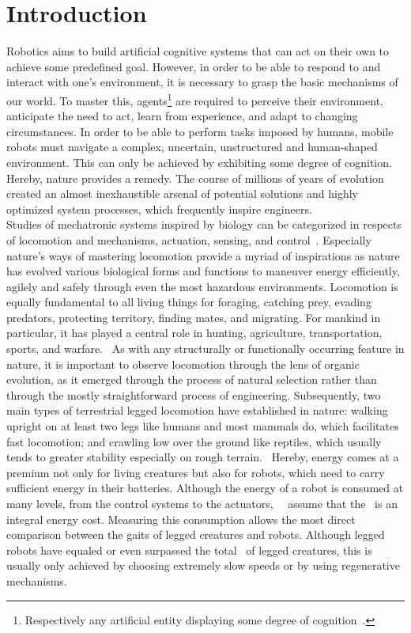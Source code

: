 \chapter{Introduction}%

Robotics aims to build artificial cognitive systems that can act on their own to achieve some predefined goal. However, in order to be able to respond to and interact with one's environment, it is necessary to grasp the basic mechanisms of our world. To master this, agents\footnote{Respectively any artificial entity displaying some degree of cognition~\cite{Vernon2014}.} are required to perceive their environment, anticipate the need to act, learn from experience, and adapt to changing circumstances. In order to be able to perform tasks imposed by humans, mobile robots must navigate a complex, uncertain, unstructured and human-shaped environment. This can only be achieved by exhibiting some degree of cognition.~\cite{Vernon2014} Hereby, nature provides a remedy. The course of millions of years of evolution created an almost inexhaustible arsenal of potential solutions and highly optimized system processes, which frequently inspire engineers.~\cite{Siciliano2016} \\

Studies of mechatronic systems inspired by biology can be categorized in respects of locomotion and mechanisms, actuation, sensing, and control~\cite{Sitti2013}. Especially nature's ways of mastering locomotion provide a myriad of inspirations as nature has evolved various biological forms and functions to maneuver energy efficiently, agilely and safely through even the most hazardous environments. Locomotion is equally fundamental to all living things for foraging, catching prey, evading predators, protecting territory, finding mates, and migrating. For mankind in particular, it has played a central role in hunting, agriculture, transportation, sports, and warfare.~\cite{Lee2018} As with any structurally or functionally occurring feature in nature, it is important to observe locomotion through the lens of organic evolution, as it emerged through the process of natural selection rather than through the mostly straightforward process of engineering. Subsequently, two main types of terrestrial legged locomotion have established in nature: walking upright on at least two legs like humans and most mammals do, which facilitates fast locomotion; and crawling low over the ground like reptiles, which usually tends to greater stability especially on rough terrain.~\cite{Sitti2013} Hereby, energy comes at a premium not only for living creatures but also for robots, which need to carry sufficient energy in their batteries. Although the energy of a robot is consumed at many levels, from the control systems to the actuators,~\citeauthor{Lee2018}~\cite{Lee2018} assume that the~ is an integral energy cost. Measuring this consumption allows the most direct comparison between the gaits of legged creatures and robots. Although legged robots have equaled or even surpassed the total~ of legged creatures, this is usually only achieved by choosing extremely slow speeds or by using regenerative mechanisms.~\cite{Lee2018}\\

